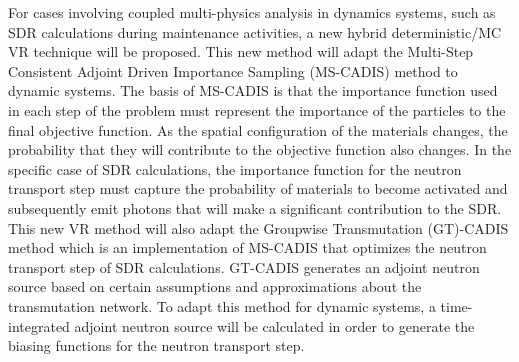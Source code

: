 For cases involving coupled multi-physics analysis in dynamics systems, such as SDR calculations
during maintenance activities,
a new hybrid deterministic/MC VR technique will be proposed.
This new method will adapt the Multi-Step Consistent Adjoint Driven Importance Sampling
(MS-CADIS) method to dynamic systems.
 The basis of MS-CADIS is that the importance function used
in each step of the problem must represent the importance of the particles to
the final objective function.  As the spatial configuration of the materials
changes, the probability that they will contribute to the objective function
also changes.
In the specific case of SDR calculations, the importance function for the neutron transport step
must capture the probability of materials to become activated and subsequently emit photons that
will make a significant contribution to the SDR.
This new VR method will also adapt 
 the Groupwise Transmutation (GT)-CADIS method 
which is an implementation of MS-CADIS
that optimizes the neutron transport step of SDR calculations.
GT-CADIS generates an adjoint
neutron source based on certain assumptions and approximations about the
transmutation network.  To adapt this method for dynamic systems, 
a time-integrated adjoint
neutron source will be calculated 
in order to generate the biasing functions for the neutron transport step.



